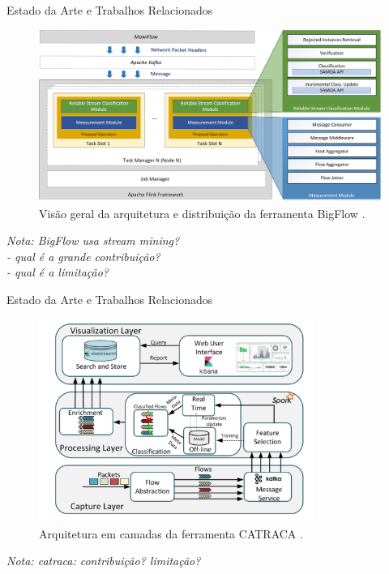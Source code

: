 \documentclass[aspectratio=43,10pt]{beamer}
\newcommand{\nota}[1]{\hspace*{-0.5cm}\textit{{\color[rgb]{1,0,0}Nota: #1}}}
\begin{document}
\begin{frame}[fragile]{Estado da Arte e Trabalhos Relacionados}
\begin{figure}[ht]
  \centering
  \includegraphics[width=\textwidth]{figuras/bigflow-fig5-bigflow_arch.png}
  \caption{Visão geral da arquitetura e distribuição da ferramenta BigFlow \cite{Viegas2019}.}
  \label{fig:bigflow-arch}
\end{figure}
\nota{BigFlow usa stream mining?\\
- qual é a grande contribuição?\\
- qual é a limitação?}
\end{frame}

\begin{frame}[fragile]{Estado da Arte e Trabalhos Relacionados}
\begin{figure}[ht]
  \centering
  \includegraphics[width=0.8\textwidth]{figuras/catraca-arch.png}
  \caption{Arquitetura em camadas da ferramenta CATRACA \cite{Lopez2018}.}
  \label{fig:catraca}
\end{figure}
\nota{catraca: contribuição? limitação?}
\end{frame}
\end{document}
